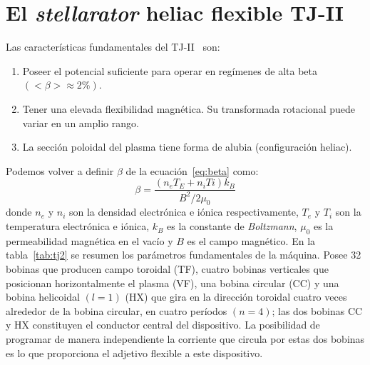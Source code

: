 \section{El \textit{stellarator} heliac flexible TJ-II}
Las características fundamentales del TJ-II~\cite{doi:10.13182/FST17-131-139} son:
\begin{enumerate}[(1)]
    \item Poseer el potencial suficiente para operar en regímenes de alta beta $(<\beta>\approx2\%)$.
    \item Tener una elevada flexibilidad magnética. Su transformada rotacional puede variar
    en un amplio rango.
    \item La sección poloidal del plasma tiene forma de alubia (configuración heliac).
\end{enumerate}
Podemos volver a definir $\beta$ de la ecuación~\eqref{eq:beta} como:
\begin{equation}\label{eq:beta2}
    \beta=\frac{(n_eT_E+n_iTi)k_B}{B^2/2\mu_0}
\end{equation}
donde $n_e$ y $n_i$ son la densidad electrónica e iónica respectivamente, $T_e$ y $T_i$ son la temperatura
electrónica e iónica, $k_B$ es la constante de \textit{Boltzmann}, $\mu_0$ es la permeabilidad magnética en el
vacío y $B$ es el campo magnético.
En la tabla~\ref{tab:tj2} se resumen los parámetros fundamentales de la máquina. Posee 32 bobinas
que producen campo toroidal (TF), cuatro bobinas verticales que posicionan horizontalmente
el plasma (VF), una bobina circular (CC) y una bobina helicoidal $(l=1)$ (HX) que gira
en la dirección toroidal cuatro veces alrededor de la bobina circular, en cuatro períodos $(n=4)$; las dos bobinas CC y
HX constituyen el conductor central del dispositivo. La posibilidad de programar de manera
independiente la corriente que circula por estas dos bobinas es lo que proporciona el adjetivo
flexible a este dispositivo.
